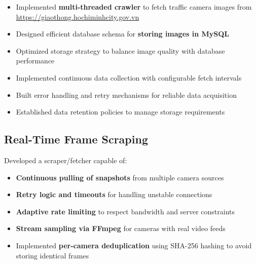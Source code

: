 \begin{itemize}
    \item Implemented \textbf{multi-threaded crawler} to fetch traffic camera images from \url{https://giaothong.hochiminhcity.gov.vn}
    \item Designed efficient database schema for \textbf{storing images in MySQL}
    \item Optimized storage strategy to balance image quality with database performance
    \item Implemented continuous data collection with configurable fetch intervals
    \item Built error handling and retry mechanisms for reliable data acquisition
    \item Established data retention policies to manage storage requirements
\end{itemize}



\subsection{Real-Time Frame Scraping}

Developed a scraper/fetcher capable of:

\begin{itemize}
    \item \textbf{Continuous pulling of snapshots} from multiple camera sources
    \item \textbf{Retry logic and timeouts} for handling unstable connections
    \item \textbf{Adaptive rate limiting} to respect bandwidth and server constraints
    \item \textbf{Stream sampling via FFmpeg} for cameras with real video feeds
    \item Implemented \textbf{per-camera deduplication} using SHA-256 hashing to avoid storing identical frames
\end{itemize}

